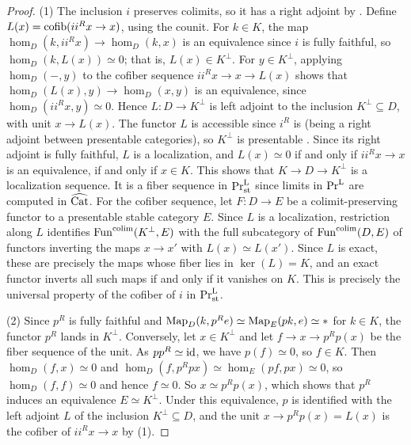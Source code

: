 	\begin{proof}
		(1) The inclusion $i$ preserves colimits, so it has a right adjoint by . Define $L(x) = \operatorname{cofib}(ii^Rx \to x)$, using the counit. For $k \in K$, the map $\hom_D(k,ii^Rx) \to \hom_D(k,x)$ is an equivalence since $i$ is fully faithful, so $\hom_D(k,L(x)) \simeq 0$; that is, $L(x) \in K^{\perp}$. For $y \in K^{\perp}$, applying $\hom_D(-,y)$ to the cofiber sequence $ii^Rx \to x \to L(x)$ shows that $\hom_D(L(x),y) \to \hom_D(x,y)$ is an equivalence, since $\hom_D(ii^Rx,y) \simeq 0$. Hence $L\colon D \to K^{\perp}$ is left adjoint to the inclusion $K^{\perp} \subseteq D$, with unit $x \to L(x)$. The functor $L$ is accessible since $i^R$ is (being a right adjoint between presentable categories), so $K^{\perp}$ is presentable \cite[Section~5.5.4]{lurie2009HTT}. Since its right adjoint is fully faithful, $L$ is a localization, and $L(x) \simeq 0$ if and only if $ii^Rx \to x$ is an equivalence, if and only if $x \in K$. This shows that $K \to D \to K^{\perp}$ is a localization sequence. It is a fiber sequence in $\textup{Pr}^{\textup{L}}_{\operatorname{st}}$ since limits in $\textup{Pr}^{\textup{L}}$ are computed in $\widehat{{\textup{Cat}}}$. For the cofiber sequence, let $F\colon D \to E$ be a colimit-preserving functor to a presentable stable category $E$. Since $L$ is a localization, restriction along $L$ identifies $\operatorname{Fun}^{\operatorname{colim}}(K^{\perp},E)$ with the full subcategory of $\operatorname{Fun}^{\operatorname{colim}}(D,E)$ of functors inverting the maps $x \to x'$ with $L(x) \simeq L(x')$. Since $L$ is exact, these are precisely the maps whose fiber lies in $\ker(L) = K$, and an exact functor inverts all such maps if and only if it vanishes on $K$. This is precisely the universal property of the cofiber of $i$ in $\textup{Pr}^{\textup{L}}_{\operatorname{st}}$.

		(2) Since $p^R$ is fully faithful and $\operatorname{Map}_D(k,p^Re) \simeq \operatorname{Map}_E(pk,e) \simeq *$ for $k \in K$, the functor $p^R$ lands in $K^{\perp}$. Conversely, let $x \in K^{\perp}$ and let $f \to x \to p^Rp(x)$ be the fiber sequence of the unit. As $pp^R \simeq \operatorname{id}$, we have $p(f) \simeq 0$, so $f \in K$. Then $\hom_D(f,x) \simeq 0$ and $\hom_D(f,p^Rpx) \simeq \hom_E(pf,px) \simeq 0$, so $\hom_D(f,f) \simeq 0$ and hence $f \simeq 0$. So $x \simeq p^Rp(x)$, which shows that $p^R$ induces an equivalence $E \simeq K^{\perp}$. Under this equivalence, $p$ is identified with the left adjoint $L$ of the inclusion $K^{\perp} \subseteq D$, and the unit $x \to p^Rp(x) = L(x)$ is the cofiber of $ii^Rx \to x$ by (1).
	\end{proof}


